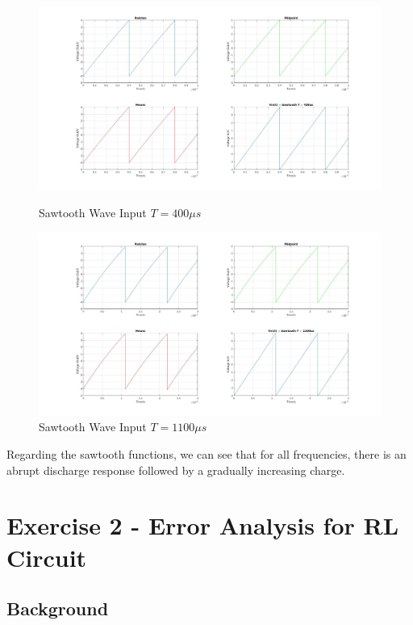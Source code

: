 \documentclass[11pt,a4paper]{article}
\begin{document}
\begin{figure}[h]
	\vspace{-5mm}
	\centering
	\includegraphics[width=\textwidth]{Ex1_Figs/saw400.jpg}
	\vspace{-10mm}
	\caption{Sawtooth Wave Input $T = 400 \mu s$}
	\label{fig:RL15}
	\includegraphics[width=\textwidth]{Ex1_Figs/saw1100.jpg}
	\vspace{-10mm}
	\caption{Sawtooth Wave Input $T = 1100 \mu s$}
	\label{fig:RL16}
\end{figure}

\FloatBarrier
Regarding the sawtooth functions, we can see that for all frequencies, there is an abrupt discharge response followed by a gradually increasing charge.
\pagebreak

\section{Exercise 2 - Error Analysis for RL Circuit}\vspace{-1mm}

\subsection{Background}
\end{document}
